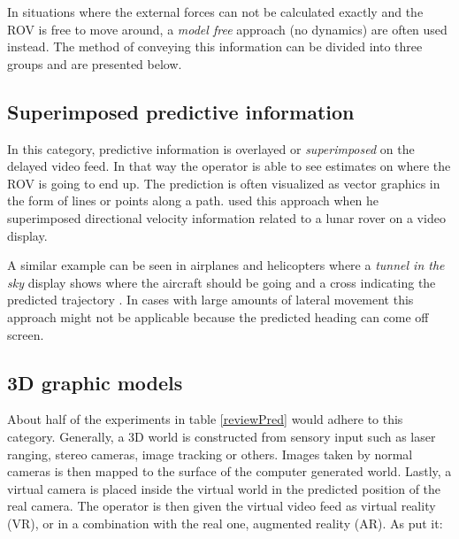 In situations where the external forces can not be calculated exactly and the ROV is free to move around, a \emph{model free} approach (no dynamics) are often used instead. The method of conveying this information can be divided into three groups and are presented below.




\subsection{Superimposed predictive information}


In this category, predictive information is overlayed or \emph{superimposed} on the delayed video feed. In that way the operator is able to see estimates on where the ROV is going to end up. The prediction is often visualized as vector graphics in the form of lines or points along a path. \citet{Mathan1996} used this approach when he superimposed directional velocity information related to a lunar rover on a video display.

A similar example can be seen in airplanes and helicopters where a \emph{tunnel in the sky} display shows where the aircraft should be going and a cross indicating the predicted trajectory \citep{Grunwald1981}. In cases with large amounts of lateral movement this approach might not be applicable because the predicted heading can come off screen.

\subsection{3D graphic models}

About half of the experiments in table \ref{reviewPred} would adhere to this category. Generally, a 3D world is constructed from sensory input such as laser ranging, stereo cameras, image tracking or others. Images taken by normal cameras is then mapped to the surface of the computer generated world. Lastly, a virtual camera is placed inside the virtual world in the predicted position of the real camera. The operator is then given the virtual video feed as virtual reality (VR), or in a combination with the real one, augmented reality (AR). As \citet{Hu2016} put it: 

